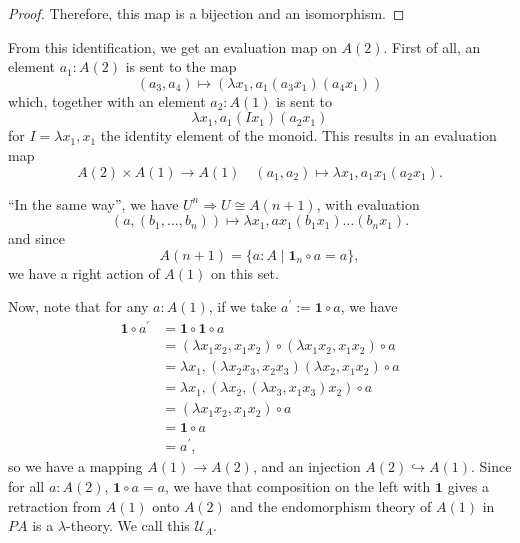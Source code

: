 \documentclass{amsbook}
\theoremstyle{definition}
\begin{document}
\begin{proof}
    Therefore, this map is a bijection and an isomorphism.
  \end{proof}

  From this identification, we get an evaluation map on $ A(2) $. First of all, an element $ a_1 : A(2) $ is sent to the map
  \[ (a_3, a_4) \mapsto (\lambda x_1, a_1 (a_3 x_1) (a_4 x_1)) \]
  which, together with an element $ a_2: A(1) $ is sent to
  \[ \lambda x_1, a_1 (I x_1) (a_2 x_1) \]
  for $ I = \lambda x_1, x_1 $ the identity element of the monoid. This results in an evaluation map
  \[ A(2) \times A(1) \to A(1) \quad (a_1, a_2) \mapsto \lambda x_1, a_1 x_1 (a_2 x_1). \]

  ``In the same way'', we have $ U^n \Rightarrow U \cong A(n + 1) $, with evaluation
  \[ (a, (b_1, \dots, b_n)) \mapsto \lambda x_1, a x_1 (b_1 x_1) \dots (b_n x_1). \]
  and since
  \[ A(n + 1) = \{ a : A \mid \mathbf 1_n \circ a = a \}, \]
  we have a right action of $ A(1) $ on this set.

  Now, note that for any $ a: A(1) $, if we take $ a^\prime := \mathbf 1 \circ a $, we have
  \begin{align*}
    \mathbf 1 \circ a^\prime &= \mathbf 1 \circ \mathbf 1 \circ a\\
    &= (\lambda x_1 x_2, x_1 x_2) \circ (\lambda x_1 x_2, x_1 x_2) \circ a\\
    &= \lambda x_1, (\lambda x_2 x_3, x_2 x_3) (\lambda x_2, x_1 x_2) \circ a\\
    &= \lambda x_1, (\lambda x_2, (\lambda x_3, x_1 x_3) x_2)  \circ a\\
    &= (\lambda x_1 x_2, x_1 x_2) \circ a\\
    &= \mathbf 1 \circ a\\
    &= a^\prime,
  \end{align*}
  so we have a mapping $ A(1) \to A(2) $, and an injection $ A(2) \hookrightarrow A(1) $. Since for all $ a : A(2) $, $ \mathbf 1 \circ a = a $, we have that composition on the left with $ \mathbf 1 $ gives a retraction from $ A(1) $ onto $ A(2) $ and the endomorphism theory of $ A(1) $ in $ PA $ is a $ \lambda $-theory. We call this $ \mathcal U_A $.

  
  
\end{document}
